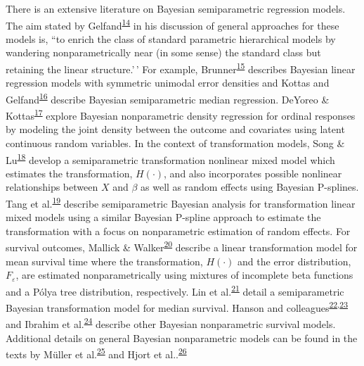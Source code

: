 \documentclass[
]{article}
\begin{document}
There is an extensive literature on Bayesian semiparametric regression models. The aim stated by Gelfand\textsuperscript{\protect\hyperlink{ref-gelfand_approaches_1999}{14}} in his discussion of general approaches for these models is, ``to enrich the class of standard parametric hierarchical models by wandering nonparametrically near (in some sense) the standard class but retaining the linear structure.'\,' For example, Brunner\textsuperscript{\protect\hyperlink{ref-brunner_bayesian_1995}{15}} describes Bayesian linear regression models with symmetric unimodal error densities and Kottas and Gelfand\textsuperscript{\protect\hyperlink{ref-kottas_bayesian_2001}{16}} describe Bayesian semiparametric median regression.
DeYoreo \& Kottas\textsuperscript{\protect\hyperlink{ref-deyoreo_bayesian_2020}{17}} explore Bayesian nonparametric density regression for ordinal responses by modeling the joint density between the outcome and covariates using latent continuous random variables. In the context of transformation models, Song \& Lu\textsuperscript{\protect\hyperlink{ref-song_semiparametric_2012}{18}} develop a semiparametric transformation nonlinear mixed model which estimates the transformation, \(H(\cdot)\), and also incorporates possible nonlinear relationships between \(X\) and \(\beta\) as well as random effects using Bayesian P-splines. Tang et al.\textsuperscript{\protect\hyperlink{ref-tang_semiparametric_2018}{19}} describe semiparametric Bayesian analysis for transformation linear mixed models using a similar Bayesian P-spline approach to estimate the transformation with a focus on nonparametric estimation of random effects. For survival outcomes, Mallick \& Walker\textsuperscript{\protect\hyperlink{ref-mallick_bayesian_2003}{20}} describe a linear transformation model for mean survival time where the transformation, \(H(\cdot)\) and the error distribution, \(F_{\varepsilon}\), are estimated nonparametrically using mixtures of incomplete beta functions and a Pólya tree distribution, respectively. Lin et al.\textsuperscript{\protect\hyperlink{ref-lin_semiparametric_2012}{21}} detail a semiparametric Bayesian transformation model for median survival. Hanson and colleagues\textsuperscript{\protect\hyperlink{ref-damien_surviving_2013}{22},\protect\hyperlink{ref-hanson_bayesian_2007}{23}} and Ibrahim et al.\textsuperscript{\protect\hyperlink{ref-ibrahim_bayesian_2010}{24}} describe other Bayesian nonparametric survival models. Additional details on general Bayesian nonparametric models can be found in the texts by Müller et al.\textsuperscript{\protect\hyperlink{ref-muller_bayesian_2015}{25}} and Hjort et al..\textsuperscript{\protect\hyperlink{ref-hjort_bayesian_2010}{26}}
\end{document}

